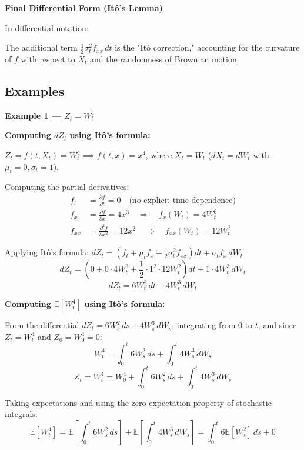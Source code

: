 \documentclass[12pt,a4paper]{article}
\theoremstyle{definition}
\begin{document}
\textbf{Final Differential Form (Itô's Lemma)}

In differential notation:
\begin{center}
\end{center}

The additional term $\frac{1}{2} \sigma_t^2 f_{xx} \, dt$ is the "Itô correction," accounting for the curvature of $f$ with respect to $X_t$ and the randomness of Brownian motion.

\subsection{Examples}

\textbf{Example 1 — $Z_t = W_t^4$}

\textbf{Computing $dZ_t$ using Itô's formula:}

$Z_t = f(t, X_t) = W_t^4 \implies f(t, x) = x^4$, where $X_t = W_t$ ($dX_t = dW_t$ with $\mu_t = 0, \sigma_t = 1$).

Computing the partial derivatives:
\begin{align}
f_t &= \frac{\partial f}{\partial t} = 0 \quad \text{(no explicit time dependence)} \\
f_x &= \frac{\partial f}{\partial x} = 4x^3 \quad \Rightarrow \quad f_x(W_t) = 4W_t^3 \\
f_{xx} &= \frac{\partial^2 f}{\partial x^2} = 12x^2 \quad \Rightarrow \quad f_{xx}(W_t) = 12W_t^2
\end{align}

Applying Itô's formula: $dZ_t = \left(f_t + \mu_t f_x + \frac{1}{2} \sigma_t^2 f_{xx}\right) dt + \sigma_t f_x \, dW_t$
\[
dZ_t = \left(0 + 0 \cdot 4W_t^3 + \frac{1}{2} \cdot 1^2 \cdot 12W_t^2\right) dt + 1 \cdot 4W_t^3 \, dW_t
\]
\[
dZ_t = 6W_t^2 \, dt + 4W_t^3 \, dW_t
\]

\textbf{Computing $\mathbb{E}[W_t^4]$ using Itô's formula:}

From the differential $dZ_t = 6W_s^2 \, ds + 4W_s^3 \, dW_s$, integrating from $0$ to $t$, and since $Z_t = W_t^4$ and $Z_0 = W_0^4 = 0$:
\[
W_t^4 = \int_0^t 6W_s^2 \, ds + \int_0^t 4W_s^3 \, dW_s
\]
\[
Z_t = W_t^4 = W_0^4 + \int_0^t 6W_s^2 \, ds + \int_0^t 4W_s^3 \, dW_s
\]

Taking expectations and using the zero expectation property of stochastic integrals:
\[
\mathbb{E}[W_t^4] = \mathbb{E}\left[\int_0^t 6W_s^2 \, ds\right] + \mathbb{E}\left[\int_0^t 4W_s^3 \, dW_s\right] = \int_0^t 6\mathbb{E}[W_s^2] \, ds + 0
\]
\end{document}
